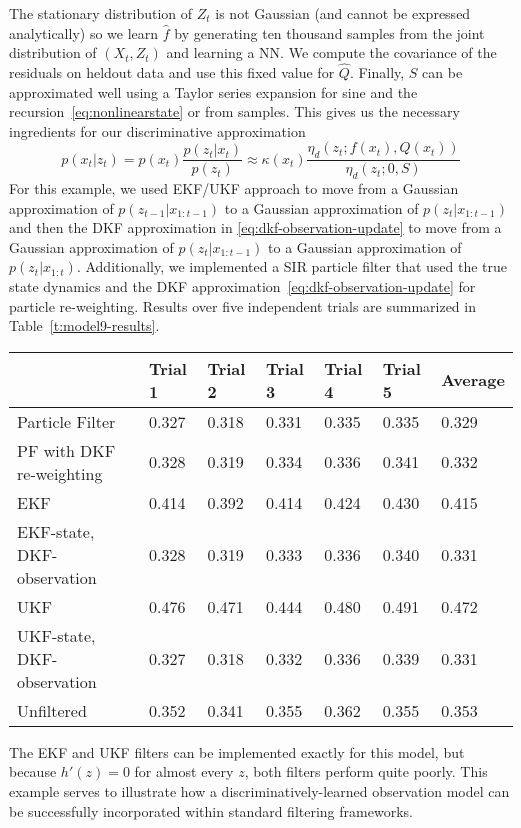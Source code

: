 The stationary distribution of $Z_t$ is not Gaussian (and cannot be expressed analytically) so we learn $\hat f$ by generating ten thousand samples from the joint distribution of $(X_t,Z_t)$ and learning a NN.  We compute the covariance of the residuals on heldout data and use this fixed value for $\hat Q$.  Finally, $S$ can be approximated well using a Taylor series expansion for sine and the recursion~\eqref{eq:nonlinearstate} or from samples.  This gives us the necessary ingredients for our discriminative approximation 
\begin{equation} \label{eq:dkf-observation-update}
p(x_t|z_t) =  p(x_t) \frac{p(z_t|x_t)}{p(z_t)}
\approx \kappa(x_t) \frac{\eta_d(z_t;f(x_t),Q(x_t))}{\eta_d(z_t;0,S)}
\end{equation}
For this example, we used EKF/UKF approach to move from a Gaussian approximation of $p(z_{t-1}|x_{1:t-1})$ to a Gaussian approximation of $p(z_t|x_{1:t-1})$ and then the DKF approximation in \eqref{eq:dkf-observation-update} to move from a Gaussian approximation of $p(z_t|x_{1:t-1})$ to a Gaussian approximation of $p(z_t|x_{1:t})$.  Additionally, we implemented a SIR particle filter that used the true state dynamics and the DKF approximation~\eqref{eq:dkf-observation-update} for particle re-weighting.  Results over five independent trials are summarized in Table~\ref{t:model9-results}.

\begin{table*}[h]
\centering
\caption{Normalized RMSE for different filtering approaches to Model~\ref{s:nonlinear_state_ex}}
\label{t:model9-results}
\begin{tabular}{|l|lllll|l|}
\hline
                                     & Trial 1 & Trial 2 & Trial 3 & Trial 4 & Trial 5 & Average \\ \hline
Particle Filter                       & 0.327   & 0.318   & 0.331   & 0.335   & 0.335   & 0.329   \\
PF with DKF re-weighting & 0.328   & 0.319   & 0.334   & 0.336   & 0.341   & 0.332   \\ \hline
EKF                                   & 0.414   & 0.392   & 0.414   & 0.424   & 0.430   & 0.415   \\
EKF-state, DKF-observation            & 0.328   & 0.319   & 0.333   & 0.336   & 0.340   & 0.331   \\ \hline
UKF                                   & 0.476   & 0.471   & 0.444   & 0.480   & 0.491   & 0.472   \\
UKF-state, DKF-observation            & 0.327   & 0.318   & 0.332   & 0.336   & 0.339   & 0.331   \\ \hline
Unfiltered                            & 0.352   & 0.341   & 0.355   & 0.362   & 0.355   & 0.353   \\ \hline
\end{tabular}
\end{table*}

The EKF and UKF filters can be implemented exactly for this model, but because $h'(z)=0$ for almost every $z$, both filters perform quite poorly.  This example serves to illustrate how a discriminatively-learned observation model can be successfully incorporated within standard filtering frameworks.


